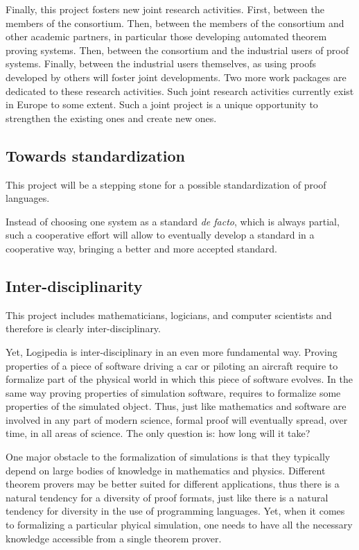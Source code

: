 Finally, this project fosters new joint research activities. First,
between the members of the consortium. Then, between the members of
the consortium and other academic partners, in particular those
developing automated theorem proving systems. Then, between the
consortium and the industrial users of proof systems. Finally, between
the industrial users themselves, as using proofs developed by others
will foster joint developments. Two more work packages are dedicated
to these research activities.  Such joint research activities
currently exist in Europe to some extent.  Such a joint project is a
unique opportunity to strengthen the existing ones and create new
ones.

\subsection{Towards standardization}

This project will be a stepping stone for a possible standardization
of proof languages. 

Instead of choosing one system as a standard {\em de facto}, which is
always partial, such a cooperative effort will allow to eventually
develop a standard in a cooperative way, bringing a better and more
accepted standard.

\subsection{Inter-disciplinarity}
This project includes mathematicians, logicians, and computer
scientists and therefore is clearly inter-disciplinary.

Yet, {\sf Logipedia} is inter-disciplinary in an even more fundamental
way. Proving properties of a piece of software driving a car or
piloting an aircraft require to formalize part of the physical world
in which this piece of software evolves. In the same way proving
properties of simulation software, requires to formalize some
properties of the simulated object.  Thus, just like mathematics and
software are involved in any part of modern science, formal proof will
eventually spread, over time, in all areas of science. The only
question is: how long will it take?

One major obstacle to the formalization of simulations is that they
typically depend on large bodies of knowledge in mathematics and
physics.  Different theorem provers may be better suited for different
applications, thus there is a natural tendency for a diversity of
proof formats, just like there is a natural tendency for diversity in
the use of programming languages.  Yet, when it comes to formalizing a
particular phyical simulation, one needs to have all the necessary
knowledge accessible from a single theorem prover.

